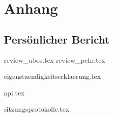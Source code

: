 \part{Anhang}

\chapter{Persönlicher Bericht}
{review_ubos.tex}
{review_pchr.tex}

{eigenstaendigkeitserklaerung.tex}

{api.tex}

{sitzungsprotokolle.tex}

